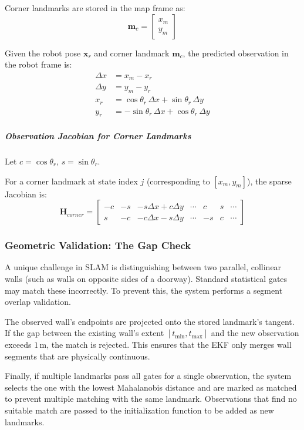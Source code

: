 \documentclass[11pt]{article}
\begin{document}
Corner landmarks are stored in the map frame as:
\begin{equation}
	\mathbf{m}_c = \begin{bmatrix} x_m \\ y_m \end{bmatrix}
\end{equation}

Given the robot pose $\mathbf{x}_r$ and corner landmark $\mathbf{m}_c$, the predicted observation in the robot frame is:
\begin{align}
	\Delta x &= x_m - x_r \\
	\Delta y &= y_m - y_r \\
	x_r &= \cos\theta_r\,\Delta x + \sin\theta_r\,\Delta y \\
	y_r &= -\sin\theta_r\,\Delta x + \cos\theta_r\,\Delta y
\end{align}

\subparagraph{Observation Jacobian for Corner Landmarks}

Let $c = \cos\theta_r$, $s = \sin\theta_r$.

For a corner landmark at state index $j$ (corresponding to $[x_m, y_m]$), the sparse Jacobian is:
\begin{equation}
	\mathbf{H}_{corner} =
	\begin{bmatrix}
		-c & -s & -s\Delta x + c\Delta y & \cdots & c & s & \cdots \\
		s & -c & -c\Delta x - s\Delta y & \cdots & -s & c & \cdots
	\end{bmatrix}
\end{equation}

\subsubsection{Geometric Validation: The Gap Check}
A unique challenge in SLAM is distinguishing between two parallel, collinear walls (such as walls on opposite sides of a doorway). Standard statistical gates may match these incorrectly. To prevent this, the system performs a segment overlap validation. 

The observed wall's endpoints are projected onto the stored landmark’s tangent. If the gap between the existing wall's extent $[t_{\min}, t_{\max}]$ and the new observation exceeds $1$\,m, the match is rejected. This ensures that the EKF only merges wall segments that are physically continuous.


Finally, if multiple landmarks pass all gates for a single observation, the system selects the one with the lowest Mahalanobis distance and are marked as matched to prevent multiple matching with the same landmark. Observations that find no suitable match are passed to the initialization function to be added as new landmarks.
\end{document}
